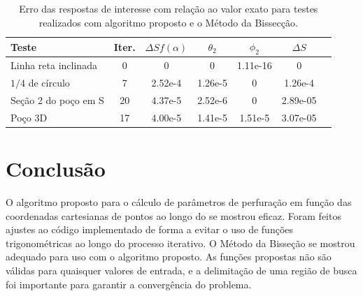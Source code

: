 \documentclass[final,3p,12pt]{elsarticle}
\begin{document}
    \begin{table}[h] 
        \centering
        \caption{Erro das respostas de interesse com relação ao valor exato para testes realizados com algoritmo proposto e o Método da Bissecção.}
        \begin{tabular}{ l c c c c c c }
            Teste & Iter. & $\Delta S f(\alpha)$ & $\theta_2$ & $\phi_2$ & $\Delta S$ \\
            \hline
            Linha reta inclinada     & 0  & 0       & 0       & 1.11e-16 & 0  \\
            $1/4$ de círculo         & 7  & 2.52e-4 & 1.26e-5 & 0        & 1.26e-4 \\
            Seção 2 do poço em S & 20 & 4.37e-5 & 2.52e-6 & 0        & 2.89e-05 \\
            Poço 3D                  & 17 & 4.00e-5 & 1.41e-5 & 1.51e-5  & 3.07e-05 
        \end{tabular}
        \label{table:resultados}
    \end{table}
    
    \section{Conclusão}
    
    O algoritmo proposto para o cálculo de parâmetros de perfuração em função das coordenadas cartesianas de pontos ao longo do se mostrou eficaz. Foram feitos ajustes ao código implementado de forma a evitar o uso de funções trigonométricas ao longo do processo iterativo.
    O Método da Bisseção se mostrou adequado para uso com o algoritmo proposto. As funções propostas não são válidas para quaisquer valores de entrada, e a delimitação de uma região de busca foi importante para garantir a convergência do problema.

    


\end{document}
